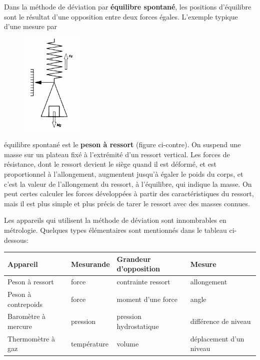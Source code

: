 Dans la méthode de déviation par \textbf{équilibre spontané}, les positions d'équilibre sont le résultat d'une opposition entre deux forces égales. L'exemple typique d'une mesure par \begin{figure}
    \centering
    \includegraphics[width=3cm]{assets/figures/mesdev.pdf}
\end{figure}
équilibre spontané est le \textbf{peson à ressort} (figure ci-contre). On suspend une masse sur un plateau fixé à l'extrémité d'un ressort vertical. Les forces de résistance, dont le ressort devient le siège quand il est déformé, et est proportionnel à l'allongement, augmentent jusqu'à égaler le poids du corps, et c'est la valeur de l'allongement du ressort, à l'équilibre, qui indique la masse. On peut certes calculer les forces développées à partir des caractéristiques du ressort, mais il est plus simple et plus précis de tarer le ressort avec des masses connues.

Les appareils qui utilisent la méthode de déviation sont innombrables en métrologie. Quelques types élémentaires sont mentionnés dans le tableau ci-dessous:
\begin{center}
    \begin{tabular}{llll}
        Appareil            & Mesurande   & Grandeur d'opposition  & Mesure                  \\ \hline
        Peson à ressort     & force       & contrainte ressort     & allongement             \\
        Peson à contrepoids & force       & moment d'une force     & angle                   \\
        Baromètre à mercure & pression    & pression hydrostatique & différence de niveau    \\
        Thermomètre à gaz   & température & volume                 & déplacement d'un niveau
    \end{tabular}
\end{center}

